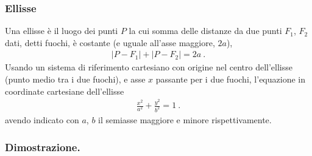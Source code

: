 \documentclass[letterpaper,10pt,english]{jupyterBook}
\begin{document}
\subsubsection{Ellisse}
\label{\detokenize{ch/analytic_geometry/analytic_geometry_2d/conics-cartesian:ellisse}}
\sphinxAtStartPar
Una ellisse è il luogo dei punti \(P\) la cui somma delle distanze da due punti \(F_1\), \(F_2\) dati, detti fuochi, è costante (e uguale all’asse maggiore, \(2 a\)),
\begin{equation*}
\begin{split}|P - F_1| + |P - F_2| = 2 a \ .\end{split}
\end{equation*}
\sphinxAtStartPar
Usando un sistema di riferimento cartesiano con origine nel centro dell’ellisse (punto medio tra i due fuochi), e asse \(x\) passante per i due fuochi, l’equazione in coordinate cartesiane dell’ellisse
\begin{equation*}
\begin{split}\frac{x^2}{a^2} + \frac{y^2}{b^2} = 1 \ .\end{split}
\end{equation*}
\sphinxAtStartPar
avendo indicato con \(a\), \(b\) il semiasse maggiore e minore rispettivamente.
\subsubsection*{Dimostrazione.}
\end{document}
